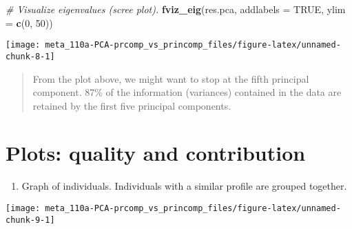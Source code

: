 \documentclass[]{book}
\newenvironment{Shaded}{\begin{snugshade}}{\end{snugshade}}
\newcommand{\CommentTok}[1]{\textcolor[rgb]{0.56,0.35,0.01}{\textit{#1}}}
\newcommand{\DataTypeTok}[1]{\textcolor[rgb]{0.13,0.29,0.53}{#1}}
\newcommand{\DecValTok}[1]{\textcolor[rgb]{0.00,0.00,0.81}{#1}}
\newcommand{\KeywordTok}[1]{\textcolor[rgb]{0.13,0.29,0.53}{\textbf{#1}}}
\newcommand{\NormalTok}[1]{#1}
\newcommand{\OtherTok}[1]{\textcolor[rgb]{0.56,0.35,0.01}{#1}}
\newcommand{\StringTok}[1]{\textcolor[rgb]{0.31,0.60,0.02}{#1}}
\providecommand{\tightlist}{%
  \setlength{\itemsep}{0pt}\setlength{\parskip}{0pt}}
\begin{document}
\begin{Shaded}
\begin{Highlighting}[]
\CommentTok{# Visualize eigenvalues (scree plot).}
\KeywordTok{fviz_eig}\NormalTok{(res.pca, }\DataTypeTok{addlabels =} \OtherTok{TRUE}\NormalTok{, }\DataTypeTok{ylim =} \KeywordTok{c}\NormalTok{(}\DecValTok{0}\NormalTok{, }\DecValTok{50}\NormalTok{))}
\end{Highlighting}
\end{Shaded}

\begin{center}\texttt{[image: meta\_110a-PCA-prcomp\_vs\_princomp\_files/figure-latex/unnamed-chunk-8-1]} \end{center}

\begin{quote}
From the plot above, we might want to stop at the fifth principal component. 87\% of the information (variances) contained in the data are retained by the first five principal components.
\end{quote}

\hypertarget{plots-quality-and-contribution}{%
\section{Plots: quality and contribution}\label{plots-quality-and-contribution}}

\begin{enumerate}
\def\labelenumi{\arabic{enumi}.}
\setcounter{enumi}{3}
\tightlist
\item
  Graph of individuals. Individuals with a similar profile are grouped together.
\end{enumerate}

\begin{Shaded}
\end{Shaded}

\begin{center}\texttt{[image: meta\_110a-PCA-prcomp\_vs\_princomp\_files/figure-latex/unnamed-chunk-9-1]} \end{center}
\end{document}
